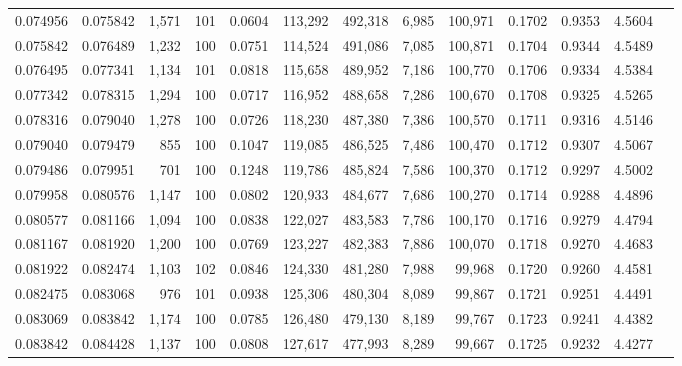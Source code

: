 \begin{tabular}{rrrrrrrrrrrrr}
0.074956 & 0.075842 & 1,571 & 101 &                                     0.0604 & 113,292 & 492,318 &   6,985 & 100,971 & 0.1702 & 0.9353 & 4.5604 \\
0.075842 & 0.076489 & 1,232 & 100 &                                     0.0751 & 114,524 & 491,086 &   7,085 & 100,871 & 0.1704 & 0.9344 & 4.5489 \\
0.076495 & 0.077341 & 1,134 & 101 &                                     0.0818 & 115,658 & 489,952 &   7,186 & 100,770 & 0.1706 & 0.9334 & 4.5384 \\
0.077342 & 0.078315 & 1,294 & 100 &                                     0.0717 & 116,952 & 488,658 &   7,286 & 100,670 & 0.1708 & 0.9325 & 4.5265 \\
0.078316 & 0.079040 & 1,278 & 100 &                                     0.0726 & 118,230 & 487,380 &   7,386 & 100,570 & 0.1711 & 0.9316 & 4.5146 \\
0.079040 & 0.079479 &   855 & 100 &                                     0.1047 & 119,085 & 486,525 &   7,486 & 100,470 & 0.1712 & 0.9307 & 4.5067 \\
0.079486 & 0.079951 &   701 & 100 &                                     0.1248 & 119,786 & 485,824 &   7,586 & 100,370 & 0.1712 & 0.9297 & 4.5002 \\
0.079958 & 0.080576 & 1,147 & 100 &                                     0.0802 & 120,933 & 484,677 &   7,686 & 100,270 & 0.1714 & 0.9288 & 4.4896 \\
0.080577 & 0.081166 & 1,094 & 100 &                                     0.0838 & 122,027 & 483,583 &   7,786 & 100,170 & 0.1716 & 0.9279 & 4.4794 \\
0.081167 & 0.081920 & 1,200 & 100 &                                     0.0769 & 123,227 & 482,383 &   7,886 & 100,070 & 0.1718 & 0.9270 & 4.4683 \\
0.081922 & 0.082474 & 1,103 & 102 &                                     0.0846 & 124,330 & 481,280 &   7,988 &  99,968 & 0.1720 & 0.9260 & 4.4581 \\
0.082475 & 0.083068 &   976 & 101 &                                     0.0938 & 125,306 & 480,304 &   8,089 &  99,867 & 0.1721 & 0.9251 & 4.4491 \\
0.083069 & 0.083842 & 1,174 & 100 &                                     0.0785 & 126,480 & 479,130 &   8,189 &  99,767 & 0.1723 & 0.9241 & 4.4382 \\
0.083842 & 0.084428 & 1,137 & 100 &                                     0.0808 & 127,617 & 477,993 &   8,289 &  99,667 & 0.1725 & 0.9232 & 4.4277 \\

\end{tabular}
